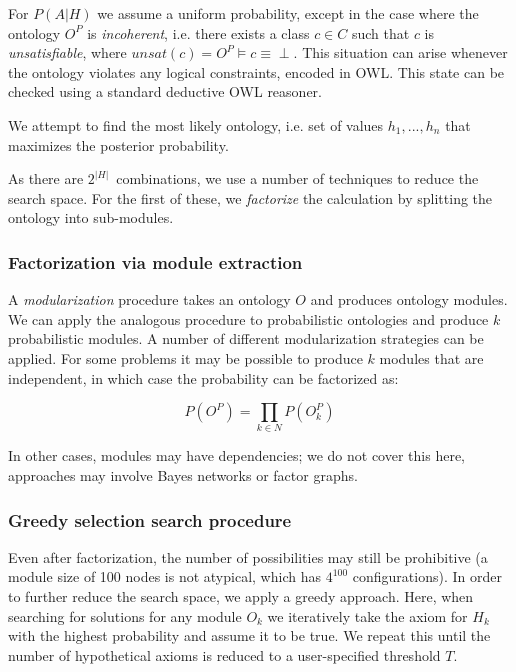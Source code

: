 \documentclass{my}
\newcommand{\eqnlabel}[1]{\label{eqn:#1}}
\begin{document}
For $P(A|H)$ we assume a uniform probability, except in the case
where the ontology $O^P$ is \emph{incoherent}, i.e. there exists a
class $c \in C$ such that $c$ is \emph{unsatisfiable}, where $unsat(c)
= O^P \vDash c \equiv \perp$. This situation can arise whenever the
ontology violates any logical constraints, encoded in OWL.  This state
can be checked using a standard deductive OWL reasoner.

We attempt to find the most likely ontology, i.e. set of values
$h_1,...,h_n$ that maximizes the posterior probability.

As there are $2^{|H|}$\ combinations, we use a number of techniques
to reduce the search space. For the first of these, we \emph{factorize}
the calculation by splitting the ontology into sub-modules.

\subsubsection{Factorization via module extraction}

A \emph{modularization} procedure takes an ontology $O$ and produces
ontology modules. We can apply the analogous procedure to
probabilistic ontologies and produce $k$ probabilistic modules. A
number of different modularization strategies can be applied. For some
problems it may be possible to produce $k$ modules that are
independent, in which case the probability can be factorized as:

\begin{equation}
P(O^P) = \prod_{k \in N}P(O^P_k)
\eqnlabel{Factorization}
\end{equation}

In other cases, modules may have dependencies; we do not cover this
here, approaches may involve Bayes networks or factor graphs.

\subsubsection{Greedy selection search procedure}

Even after factorization, the number of possibilities may still be
prohibitive (a module size of 100 nodes is not atypical, which has $4^100$ configurations).
In order to further reduce the search space, we apply a
greedy approach. Here, when searching for solutions for any module
$O_k$ we iteratively take the axiom for $H_k$ with the highest
probability and assume it to be true. We repeat this until the number
of hypothetical axioms is reduced to a user-specified threshold $T$.
\end{document}
